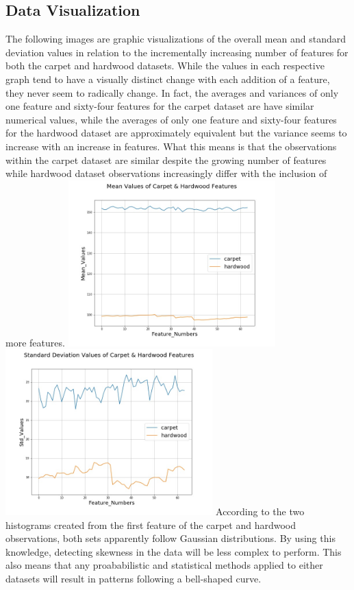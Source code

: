 \documentclass[a4paper,12pt]{IEEEtran}
\begin{document}
\subsection{Data Visualization}
\label{sec2}
The following images are graphic visualizations of the overall mean and standard deviation values in relation to the incrementally increasing number of features for both the carpet and hardwood datasets. While the values in each respective graph tend to have a visually distinct change with each addition of a feature, they never seem to radically change. In fact, the averages and variances of only one feature and sixty-four features for the carpet dataset are have similar numerical values, while the averages of only one feature and sixty-four features for the hardwood dataset are approximately equivalent but the variance seems to increase with an increase in features. What this means is that the observations within the carpet dataset are similar despite the growing number of features while hardwood dataset observations increasingly differ with the inclusion of more features.
\includegraphics[width=8cm]{carpethardwood_mean}
\includegraphics[width=8cm]{carpethardwood_stddev}
According to the two histograms created from the first feature of the carpet and hardwood observations, both sets apparently follow Gaussian distributions. By using this knowledge, detecting skewness in the data will be less complex to perform. This also means that any proababilistic and statistical methods applied to either datasets will result in patterns following a bell-shaped curve.
\end{document}
